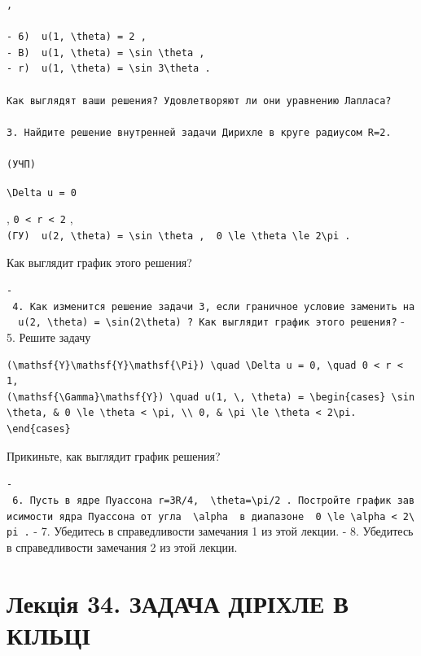\documentclass[
  ukrainian,
]{article}
\begin{document}
\begin{verbatim}
,

- 6)  u(1, \theta) = 2 ,
- B)  u(1, \theta) = \sin \theta ,
- r)  u(1, \theta) = \sin 3\theta .

Как выглядят ваши решения? Удовлетворяют ли они уравнению Лапласа?

3. Найдите решение внутренней задачи Дирихле в круге радиусом R=2.

(УЧП)
\end{verbatim}

\texttt{\textbackslash{}Delta\ u\ =\ 0}

, \texttt{0\ \textless{}\ r\ \textless{}\ 2} ,\\
\texttt{(ГУ)\ \ \textquotesingle{}u(2,\ \textbackslash{}theta)\ =\ \textbackslash{}sin\ \textbackslash{}theta\textquotesingle{}\ ,\ \ \textquotesingle{}0\ \textbackslash{}le\ \textbackslash{}theta\ \textbackslash{}le\ 2\textbackslash{}pi\textquotesingle{}\ .}

Как выглядит график этого решения?

\texttt{-\ 4.\ Как\ изменится\ решение\ задачи\ 3,\ если\ граничное\ условие\ заменить\ на\ \ \textquotesingle{}u(2,\ \textbackslash{}theta)\ =\ \textbackslash{}sin(2\textbackslash{}theta)\textquotesingle{}\ ?\ Как\ выглядит\ график\ этого\ решения?}
- 5. Решите задачу

\begin{verbatim}
(\mathsf{Y}\mathsf{Y}\mathsf{\Pi}) \quad \Delta u = 0, \quad 0 < r < 1,
(\mathsf{\Gamma}\mathsf{Y}) \quad u(1, \, \theta) = \begin{cases} \sin \theta, & 0 \le \theta < \pi, \\ 0, & \pi \le \theta < 2\pi. \end{cases}
\end{verbatim}

Прикиньте, как выглядит график решения?

\texttt{-\ 6.\ Пусть\ в\ ядре\ Пуассона\ r=3R/4,\ \ \textquotesingle{}\textbackslash{}theta=\textbackslash{}pi/2\textquotesingle{}\ .\ Постройте\ график\ зависимости\ ядра\ Пуассона\ от\ угла\ \ \textquotesingle{}\textbackslash{}alpha\textquotesingle{}\ \ в\ диапазоне\ \ \textquotesingle{}0\ \textbackslash{}le\ \textbackslash{}alpha\ \textless{}\ 2\textbackslash{}pi\textquotesingle{}\ .}
- 7. Убедитесь в справедливости замечания 1 из этой лекции. - 8.
Убедитесь в справедливости замечания 2 из этой лекции.

\section{Лекція 34. ЗАДАЧА ДІРІХЛЕ В
КІЛЬЦІ}\label{ux43bux435ux43aux446ux456ux44f-34.-ux437ux430ux434ux430ux447ux430-ux434ux456ux440ux456ux445ux43bux435-ux432-ux43aux456ux43bux44cux446ux456}
\end{document}
